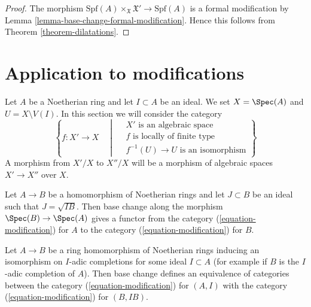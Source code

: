 \begin{proof}
The morphism $\text{Spf}(A) \times_{\mathfrak X} \mathfrak X'
\to \text{Spf}(A)$ is a formal modification by
Lemma \ref{lemma-base-change-formal-modification}.
Hence this follows from Theorem \ref{theorem-dilatations}.
\end{proof}







\section{Application to modifications}
\label{section-modifications}

\noindent
Let $A$ be a Noetherian ring and let $I \subset A$ be an ideal. We set
$X = \Spec(A)$ and $U = X \setminus V(I)$. In this section
we will consider the category
\begin{equation}
\label{equation-modification}
\left\{
f : X' \longrightarrow X
\quad \middle| \quad
\begin{matrix}
X'\text{ is an algebraic space}\\
f\text{ is locally of finite type}\\
f^{-1}(U) \to U\text{ is an isomorphism}
\end{matrix}
\right\}
\end{equation}
A morphism from $X'/X$ to $X''/X$ will be a morphism of algebraic spaces
$X' \to X''$ over $X$.

\medskip\noindent
Let $A \to B$ be a homomorphism of Noetherian rings and let $J \subset B$
be an ideal such that $J = \sqrt{I B}$. Then base
change along the morphism $\Spec(B) \to \Spec(A)$ gives a functor
from the category (\ref{equation-modification}) for $A$
to the category (\ref{equation-modification}) for $B$.

\begin{lemma}
\label{lemma-Noetherian-local-ring}
Let $A \to B$ be a ring homomorphism of Noetherian rings inducing an
isomorphism on $I$-adic completions for some ideal $I \subset A$
(for example if $B$ is the $I$-adic completion of $A$).
Then base change defines an equivalence of categories between the
category (\ref{equation-modification}) for $(A, I)$
with the category (\ref{equation-modification}) for $(B, IB)$.
\end{lemma}

